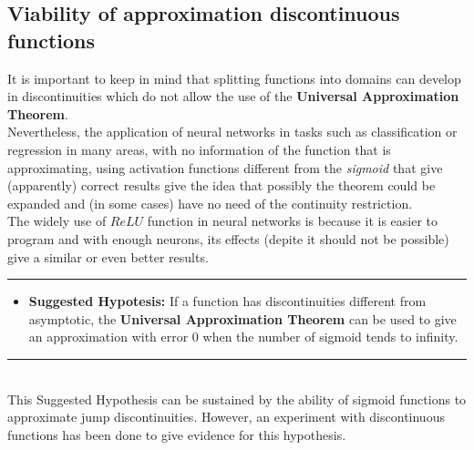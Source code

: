 \documentclass[a4paper, 11pt]{article}
\begin{document}
\subsection{Viability of approximation discontinuous functions}
It is important to keep in mind that splitting functions into domains can develop in discontinuities which do not allow the use of the \textbf{Universal Approximation Theorem}.\\
Nevertheless, the application of neural networks in tasks such as classification or regression in many areas, with no information of the function that is approximating, using activation functions different from the \textit{sigmoid} that give (apparently) correct results give the idea that possibly the theorem could be expanded and (in some cases) have no need of the continuity restriction.\\
The widely use of $ReLU$ function in neural networks is because it is easier to program and with enough neurons, its effects (depite it should not be possible) give a similar or even better results.\\
\newpage
\hspace{-1.6em}\rule{\linewidth}{0.4pt}
\begin{itemize}
    \item \textbf{Suggested Hypotesis:} If a function has discontinuities different from asymptotic, the \textbf{Universal Approximation Theorem} can be used to give an approximation with error 0 when the number of sigmoid tends to infinity.
\end{itemize}
\rule{\linewidth}{0.4pt}\\ \vspace{0.5em}
This Suggested Hypothesis can be sustained by the ability of sigmoid functions to approximate jump discontinuities. However, an experiment with discontinuous functions has been done to give evidence for this hypothesis.
\end{document}
